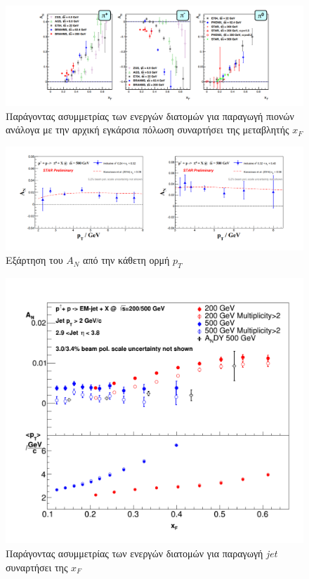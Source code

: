 	
	\begin{figure}[h!]
		\centering
		\includegraphics[scale=0.7]{STAR_Results/AN_pions_all}
	        \caption{Παράγοντας ασυμμετρίας των ενεργών διατομών για παραγωγή  πιονών ανάλογα με την αρχική εγκάρσια πόλωση συναρτήσει της μεταβλητής $x_F$}
		\label{fig4.15}
	\end{figure}
	
	
	\begin{figure}[h!]
			\centering
			\includegraphics[scale=0.5]{STAR_Results/AN_pions_pt}
			\caption{Εξάρτηση του $A_N$ από την κάθετη ορμή $p_T$}
			\label{fig4.16}
		\end{figure}
			
	
	\begin{figure}[h!]
		\centering
		\includegraphics[scale=0.7]{STAR_Results/AN_jets}
	    \caption{Παράγοντας ασυμμετρίας των ενεργών διατομών για παραγωγή \textit{jet} συναρτήσει της $x_F$}
		\label{fig4.17}
	\end{figure}
	
